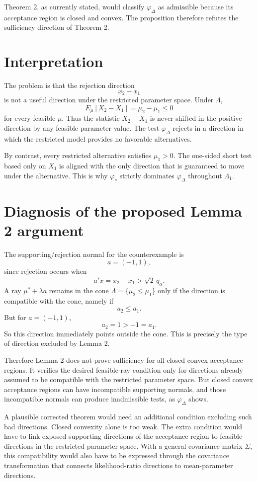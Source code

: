 \documentclass[11pt]{article}
\begin{document}
Theorem 2, as currently stated, would classify \(\varphi_\Delta\) as admissible because its acceptance region is closed and convex.  The proposition therefore refutes the sufficiency direction of Theorem 2.

\section{Interpretation}

The problem is that the rejection direction
\[
  x_2-x_1
\]
is not a useful direction under the restricted parameter space.  Under \(\Lambda\),
\[
  E_\mu[X_2-X_1]=\mu_2-
\mu_1\le 0
\]
for every feasible \(\mu\).  Thus the statistic \(X_2-X_1\) is never shifted in the positive direction by any feasible parameter value.  The test \(\varphi_\Delta\) rejects in a direction in which the restricted model provides no favorable alternatives.

By contrast, every restricted alternative satisfies \(\mu_1>0\).  The one-sided short test based only on \(X_1\) is aligned with the only direction that is guaranteed to move under the alternative.  This is why \(\varphi_s\) strictly dominates \(\varphi_\Delta\) throughout \(\Lambda_1\).

\section{Diagnosis of the proposed Lemma 2 argument}

The supporting/rejection normal for the counterexample is
\[
  a=(-1,1),
\]
since rejection occurs when
\[
  a'x=x_2-x_1>\sqrt{2}\,q_\alpha.
\]
A ray \(\mu^*+\lambda a\) remains in the cone \(\Lambda=\{\mu_2\le \mu_1\}\) only if the direction is compatible with the cone, namely if
\[
  a_2\le a_1.
\]
But for \(a=(-1,1)\),
\[
  a_2=1>-1=a_1.
\]
So this direction immediately points outside the cone.  This is precisely the type of direction excluded by Lemma 2.

Therefore Lemma 2 does not prove sufficiency for all closed convex acceptance regions.  It verifies the desired feasible-ray condition only for directions already assumed to be compatible with the restricted parameter space.  But closed convex acceptance regions can have incompatible supporting normals, and those incompatible normals can produce inadmissible tests, as \(\varphi_\Delta\) shows.

A plausible corrected theorem would need an additional condition excluding such bad directions.  Closed convexity alone is too weak.  The extra condition would have to link exposed supporting directions of the acceptance region to feasible directions in the restricted parameter space.  With a general covariance matrix \(\Sigma\), this compatibility would also have to be expressed through the covariance transformation that connects likelihood-ratio directions to mean-parameter directions.
\end{document}
